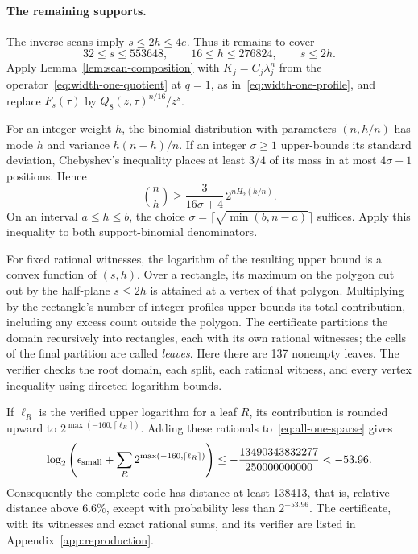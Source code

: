 \paragraph{The remaining supports.}
The inverse scans imply $s\le2h\le4e$. Thus it remains to cover
\[
 32\le s\le553648,\qquad 16\le h\le276824,\qquad s\le2h.
\]
Apply Lemma~\ref{lem:scan-composition} with $K_j=C_j\lambda_j^n$ from
the operator~\eqref{eq:width-one-quotient} at $q=1$, as
in~\eqref{eq:width-one-profile}, and replace $F_s(\tau)$ by
$Q_8(z,\tau)^{n/16}/z^s$.

For an integer weight $h$, the binomial distribution with parameters
$(n,h/n)$ has mode $h$ and variance $h(n-h)/n$. If an integer
$\sigma\ge1$ upper-bounds its standard deviation, Chebyshev's inequality
places at least $3/4$ of its mass in at most $4\sigma+1$ positions. Hence
\[
 \binom nh\ge\frac{3}{16\sigma+4}\,2^{nH_2(h/n)}.
\]
On an interval $a\le h\le b$, the choice
$\sigma=\lceil\sqrt{\min(b,n-a)}\rceil$ suffices. Apply this inequality
to both support-binomial denominators.

For fixed rational witnesses, the logarithm of the resulting upper
bound is a convex function of $(s,h)$. Over a rectangle, its maximum on
the polygon cut out by the half-plane $s\le2h$ is attained at a vertex
of that polygon. Multiplying by the rectangle's number of integer
profiles upper-bounds its total contribution, including any excess
count outside the polygon.
The certificate partitions the domain recursively into rectangles, each
with its own rational witnesses; the cells of the final partition are
called \emph{leaves}. Here there are 137 nonempty leaves. The verifier
checks the root domain, each split, each rational witness, and every
vertex inequality using directed logarithm bounds.

If $\ell_R$ is the verified upper logarithm for a leaf $R$, its
contribution is rounded upward to $2^{\max(-160,\lceil\ell_R\rceil)}$.
Adding these rationals to~\eqref{eq:all-one-sparse} gives
\[
 \log_2\left(\epsilon_{\rm small}
       +\sum_R2^{\max(-160,\lceil\ell_R\rceil)}\right)
 \le-\frac{13490343832277}{250000000000}
 <-53.96.
\]
Consequently the complete code has distance at least 138413, that is,
relative distance above $6.6\%$, except with probability less than
$2^{-53.96}$. The certificate, with its witnesses and exact rational
sums, and its verifier are listed in Appendix~\ref{app:reproduction}.
